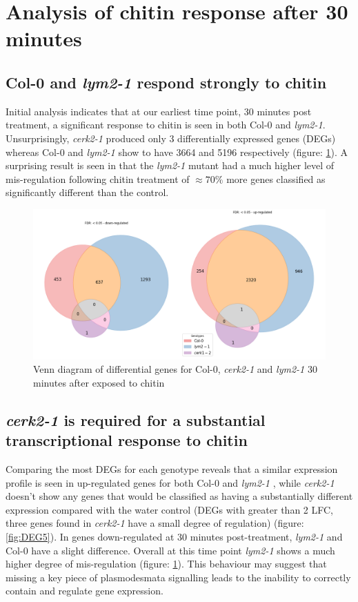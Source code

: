 \documentclass[../main.tex]{subfiles}
\begin{document}
\section{Analysis of chitin response after 30 minutes}
\label{sec:seqresults}

\subsection{Col-0 and \textit{lym2-1} respond strongly to chitin}



Initial analysis indicates that at our earliest time point, 30 minutes post
treatment, a significant response to chitin is seen in both Col-0 and
\textit{lym2-1}. Unsurprisingly, \textit{cerk2-1} produced only 3 differentially
expressed genes (DEGs) whereas Col-0 and \textit{lym2-1} show to have 3664 and
5196 respectively (figure: \ref{fig:05hrDEGs}). A surprising result is seen in that the
\textit{lym2-1} mutant had a much higher level of mis-regulation following
chitin treatment of $\approx70\%$ more genes classified as significantly different
than the control.

\begin{figure}[ht]
  \centering
  \includegraphics[width=0.8\columnwidth]{figures/vennTreatmentschitin.png}
  \caption[Venn diagram of differential genes 30 minutes post-chitin treatment]{\label{fig:05hrDEGs} Venn diagram of differential genes for Col-0,
    \textit{cerk2-1} and \textit{lym2-1} 30 minutes after exposed to chitin}
\end{figure}

\subsection{\textit{cerk2-1} is required for a substantial transcriptional response to chitin}

Comparing the most DEGs for each genotype reveals that a similar expression
profile is seen in up-regulated genes for both Col-0 and \textit{lym2-1} , while
\textit{cerk2-1} doesn't show any genes that would be classified as having a
substantially different expression compared with the water control (DEGs with
greater than 2 LFC, three genes found in \textit{cerk2-1} have a small degree of
regulation) (figure: \ref{fig:DEG5}). In genes down-regulated at 30
minutes post-treatment, \textit{lym2-1} and Col-0 have a slight difference.
Overall at this time point \textit{lym2-1} shows a much higher degree of
mis-regulation (figure: \ref{fig:05hrDEGs}). This behaviour may suggest that
missing a key piece of plasmodesmata signalling leads to the inability to
correctly contain and regulate gene expression.
\end{document}
